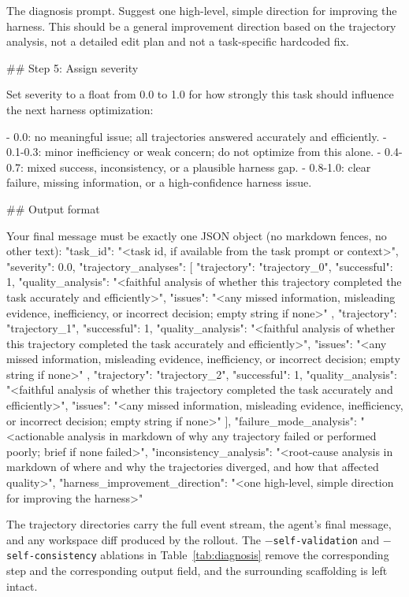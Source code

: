 \begin{promptbox}{The diagnosis prompt.}
Suggest one high-level, simple direction for improving the harness. This should be a general improvement direction based on the trajectory analysis, not a detailed edit plan and not a task-specific hardcoded fix.

## Step 5: Assign severity

Set severity to a float from 0.0 to 1.0 for how strongly this task should influence the next harness optimization:

- 0.0: no meaningful issue; all trajectories answered accurately and efficiently.
- 0.1-0.3: minor inefficiency or weak concern; do not optimize from this alone.
- 0.4-0.7: mixed success, inconsistency, or a plausible harness gap.
- 0.8-1.0: clear failure, missing information, or a high-confidence harness issue.

## Output format

Your final message must be exactly one JSON object (no markdown fences, no other text):
{
  "task_id": "<task id, if available from the task prompt or context>",
  "severity": 0.0,
  "trajectory_analyses": [
    {
      "trajectory": "trajectory_0",
      "successful": 1,
      "quality_analysis": "<faithful analysis of whether this trajectory completed the task accurately and efficiently>",
      "issues": "<any missed information, misleading evidence, inefficiency, or incorrect decision; empty string if none>"
    },
    {
      "trajectory": "trajectory_1",
      "successful": 1,
      "quality_analysis": "<faithful analysis of whether this trajectory completed the task accurately and efficiently>",
      "issues": "<any missed information, misleading evidence, inefficiency, or incorrect decision; empty string if none>"
    },
    {
      "trajectory": "trajectory_2",
      "successful": 1,
      "quality_analysis": "<faithful analysis of whether this trajectory completed the task accurately and efficiently>",
      "issues": "<any missed information, misleading evidence, inefficiency, or incorrect decision; empty string if none>"
    }
  ],
  "failure_mode_analysis": "<actionable analysis in markdown of why any trajectory failed or performed poorly; brief if none failed>",
  "inconsistency_analysis": "<root-cause analysis in markdown of where and why the trajectories diverged, and how that affected quality>",
  "harness_improvement_direction": "<one high-level, simple direction for improving the harness>"
}
\end{promptbox}

\noindent{} The trajectory directories carry the full event stream, the
agent's final message, and any workspace diff produced by the rollout.
The \texttt{$-$self-validation} and \texttt{$-$self-consistency}
ablations in Table~\ref{tab:diagnosis} remove the corresponding step
and the corresponding output field, and the surrounding scaffolding is
left intact.

